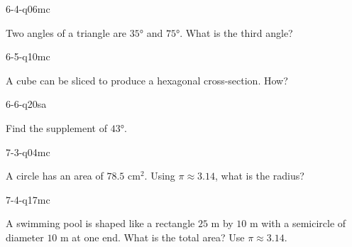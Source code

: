 \begin{practiceQuestion}{6-4-q06}{mc}
\begin{questionText}
Two angles of a triangle are $35°$ and $75°$. What is the third angle?
\end{questionText}
\end{practiceQuestion}

\begin{practiceQuestion}{6-5-q10}{mc}
\begin{questionText}
A cube can be sliced to produce a hexagonal cross-section. How?
\end{questionText}
\end{practiceQuestion}

\begin{practiceQuestion}{6-6-q20}{sa}
\begin{questionText}
Find the supplement of $43°$.
\end{questionText}
\end{practiceQuestion}

\begin{practiceQuestion}{7-3-q04}{mc}
\begin{questionText}
A circle has an area of $78.5$ cm$^2$. Using $\pi \approx 3.14$, what is the radius?
\end{questionText}
\end{practiceQuestion}

\begin{practiceQuestion}{7-4-q17}{mc}
\begin{questionText}
A swimming pool is shaped like a rectangle $25$ m by $10$ m with a semicircle of diameter $10$ m at one end. What is the total area? Use $\pi \approx 3.14$.
\end{questionText}
\end{practiceQuestion}


